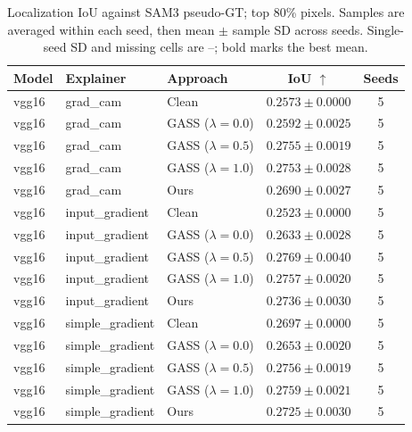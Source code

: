 \begin{table}[t]
\centering
\caption{Localization IoU against SAM3 pseudo-GT; top 80\% pixels. Samples are averaged within each seed, then mean $\pm$ sample SD across seeds. Single-seed SD and missing cells are --; bold marks the best mean.}
\begin{tabular}{lllcc}
\hline
Model & Explainer & Approach & IoU $\uparrow$ & Seeds \\
\hline
vgg16 & grad\_cam & Clean & $0.2573 \pm 0.0000$ & 5 \\
vgg16 & grad\_cam & GASS ($\lambda=0.0$) & $0.2592 \pm 0.0025$ & 5 \\
vgg16 & grad\_cam & GASS ($\lambda=0.5$) & $\mathbf{0.2755 \pm 0.0019}$ & 5 \\
vgg16 & grad\_cam & GASS ($\lambda=1.0$) & $0.2753 \pm 0.0028$ & 5 \\
vgg16 & grad\_cam & Ours & $0.2690 \pm 0.0027$ & 5 \\
\hline
vgg16 & input\_gradient & Clean & $0.2523 \pm 0.0000$ & 5 \\
vgg16 & input\_gradient & GASS ($\lambda=0.0$) & $0.2633 \pm 0.0028$ & 5 \\
vgg16 & input\_gradient & GASS ($\lambda=0.5$) & $\mathbf{0.2769 \pm 0.0040}$ & 5 \\
vgg16 & input\_gradient & GASS ($\lambda=1.0$) & $0.2757 \pm 0.0020$ & 5 \\
vgg16 & input\_gradient & Ours & $0.2736 \pm 0.0030$ & 5 \\
\hline
vgg16 & simple\_gradient & Clean & $0.2697 \pm 0.0000$ & 5 \\
vgg16 & simple\_gradient & GASS ($\lambda=0.0$) & $0.2653 \pm 0.0020$ & 5 \\
vgg16 & simple\_gradient & GASS ($\lambda=0.5$) & $0.2756 \pm 0.0019$ & 5 \\
vgg16 & simple\_gradient & GASS ($\lambda=1.0$) & $\mathbf{0.2759 \pm 0.0021}$ & 5 \\
vgg16 & simple\_gradient & Ours & $0.2725 \pm 0.0030$ & 5 \\
\hline
\end{tabular}
\end{table}
